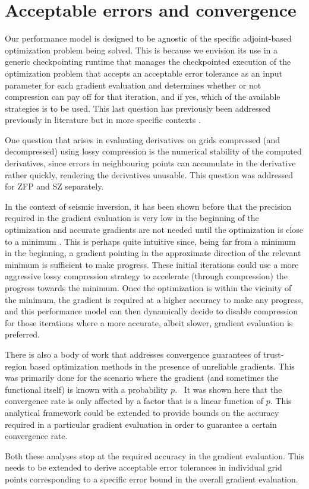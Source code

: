 \section{Acceptable errors and convergence}
\label{sec:errors}

Our performance model is designed to be agnostic of the specific adjoint-based 
optimization problem being solved. This is because we envision its use in a generic
checkpointing runtime that manages the checkpointed execution of the optimization
problem that accepts an acceptable error tolerance as an input parameter for each
gradient evaluation and determines whether or not compression can pay off for that
iteration, and if yes, which of the available strategies is to be used. This last question 
has previously been addressed previously in literature but in more specific contexts 
\cite{kunkel2017toward, tao2018optimizing}.

One question that arises in evaluating derivatives on grids compressed (and decompressed)
using lossy compression is the numerical stability of the computed derivatives, since errors
in neighbouring points can accumulate in the derivative rather quickly, rendering the derivatives
unusable. This question was addressed for ZFP \cite{zfp-derivatives} and SZ\cite{tao2017z}
separately.

In the context of seismic inversion, it has been shown before that the precision required
in the gradient evaluation is very low in the beginning of the optimization and
accurate gradients are not needed until the optimization is close to a minimum 
\cite{van20143d, boehm2016wavefield}. This is perhaps quite intuitive since, being far
from a minimum in the beginning, a gradient pointing in the approximate direction of the
relevant minimum is sufficient to make progress. These initial iterations could use a more
aggressive lossy compression strategy to accelerate (through compression) the progress 
towards the minimum. Once the optimization is within the vicinity of the minimum, the
gradient is required at a higher accuracy to make any progress, and this performance
model can then dynamically decide to disable compression for those iterations where
a more accurate, albeit slower, gradient evaluation is preferred. 

There is also a body of work that addresses convergence guarantees of trust-region
based optimization methods in the presence of unreliable gradients. This was primarily
done for the scenario where the gradient (and sometimes the functional itself) is known
with a probability $p$.~\cite{blanchet2016convergence,cartis2017global,chen2018stochastic}
It was shown here that the convergence rate is only affected by a factor that is 
a linear function of $p$. This analytical framework could be extended to provide bounds
on the accuracy required in a particular gradient evaluation in order to guarantee a certain
convergence rate.

Both these analyses stop at the required accuracy in the gradient evaluation. This needs
to be extended to derive acceptable error tolerances in individual grid points corresponding to a specific
error bound in the overall gradient evaluation. 
